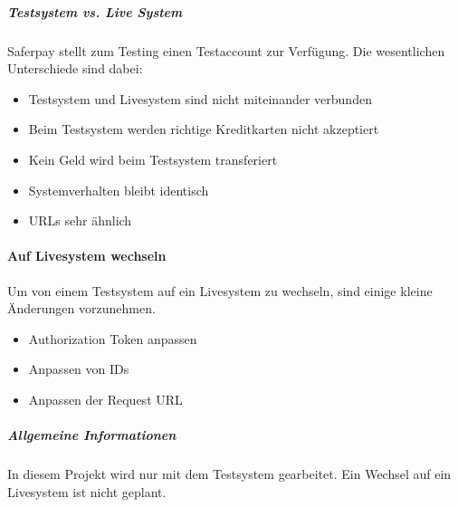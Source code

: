 \subparagraph{Testsystem vs. Live System}
Saferpay stellt zum Testing einen Testaccount zur Verfügung. Die wesentlichen Unterschiede sind dabei:
\begin{itemize}
	\item Testsystem und Livesystem sind nicht miteinander verbunden
	\item Beim Testsystem werden richtige Kreditkarten nicht akzeptiert
	\item Kein Geld wird beim Testsystem transferiert
	\item Systemverhalten bleibt identisch
	\item URLs sehr ähnlich 
\end{itemize}

\paragraph{Auf Livesystem wechseln}
Um von einem Testsystem auf ein Livesystem zu wechseln, sind einige kleine Änderungen vorzunehmen. 
\begin{itemize}
	\item Authorization Token anpassen
	\item Anpassen von IDs
	\item Anpassen der Request URL
\end{itemize} 

\subparagraph{Allgemeine Informationen}
In diesem Projekt wird nur mit dem Testsystem gearbeitet. Ein Wechsel auf ein Livesystem ist nicht geplant. 
 
